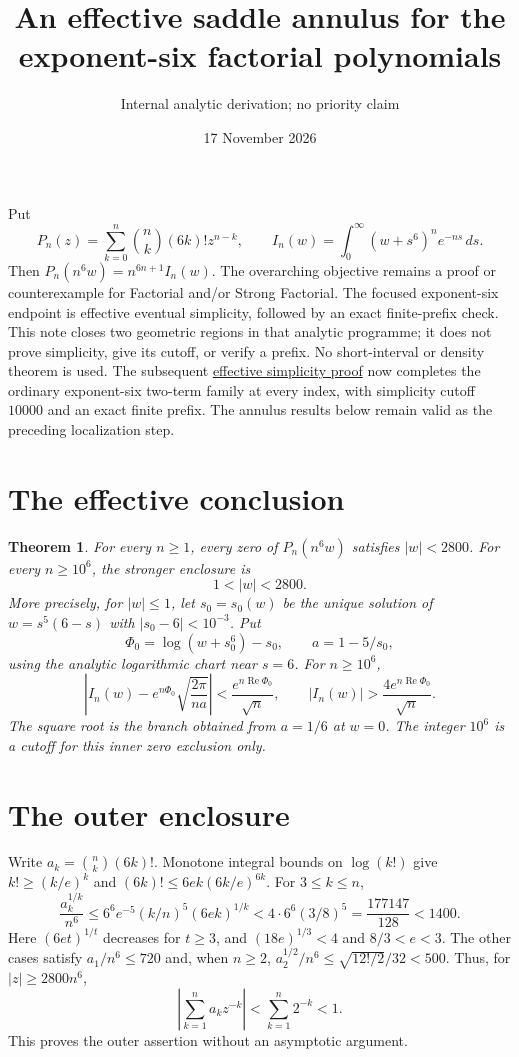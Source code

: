 \documentclass[11pt]{article}
\title{An effective saddle annulus for the exponent-six factorial polynomials}
\author{Internal analytic derivation; no priority claim}
\date{17 November 2026}
\newtheorem{theorem}{Theorem}
\begin{document}
\maketitle
Put
\[
 P_n(z)=\sum_{k=0}^n\binom nk(6k)!z^{n-k},\qquad
 I_n(w)=\int_0^\infty(w+s^6)^n e^{-ns}\,ds.
\]
Then $P_n(n^6w)=n^{6n+1}I_n(w)$. The overarching objective remains a
proof or counterexample for Factorial and/or Strong Factorial. The focused
exponent-six endpoint is effective eventual simplicity, followed by an exact
finite-prefix check. This note closes two geometric regions in that analytic
programme; it does not prove simplicity, give its cutoff, or verify a prefix.
No short-interval or density theorem is used.
The subsequent \href{EFFECTIVE_EXPONENT_SIX_SIMPLICITY.tex}{effective simplicity proof}
now completes the ordinary exponent-six two-term family at every index,
with simplicity cutoff $10000$ and an exact finite prefix. The annulus
results below remain valid as the preceding localization step.

\section{The effective conclusion}
\begin{theorem}\label{thm:annulus}
For every $n\ge1$, every zero of $P_n(n^6w)$ satisfies $|w|<2800$.
For every $n\ge10^6$, the stronger enclosure is
\[
                         1<|w|<2800.                   \tag{1}
\]
More precisely, for $|w|\le1$, let $s_0=s_0(w)$ be the unique solution of
$w=s^5(6-s)$ with $|s_0-6|<10^{-3}$. Put
\[
 \Phi_0=\log(w+s_0^6)-s_0,\qquad a=1-5/s_0,
\]
using the analytic logarithmic chart near $s=6$. For $n\ge10^6$,
\[
 \left|I_n(w)-e^{n\Phi_0}\sqrt{\frac{2\pi}{na}}\right|
 <\frac{e^{n\operatorname{Re}\Phi_0}}{\sqrt n},\qquad
 |I_n(w)|>\frac{4e^{n\operatorname{Re}\Phi_0}}{\sqrt n}. \tag{2}
\]
The square root is the branch obtained from $a=1/6$ at $w=0$.
The integer $10^6$ is a cutoff for this inner zero exclusion only.
\end{theorem}

\section{The outer enclosure}
Write $a_k=\binom nk(6k)!$. Monotone integral bounds on $\log(k!)$ give
$k!\ge(k/e)^k$ and $(6k)!\le6ek(6k/e)^{6k}$. For $3\le k\le n$,
\[
 \frac{a_k^{1/k}}{n^6}
 \le 6^6e^{-5}(k/n)^5(6ek)^{1/k}
 <4\cdot6^6(3/8)^5=\frac{177147}{128}<1400.
\]
Here $(6et)^{1/t}$ decreases for $t\ge3$, and
$(18e)^{1/3}<4$ and $8/3<e<3$. The other cases satisfy
$a_1/n^6\le720$ and, when $n\ge2$,
$a_2^{1/2}/n^6\le\sqrt{12!/2}/32<500$.
Thus, for $|z|\ge2800n^6$,
\[
 \left|\sum_{k=1}^n a_kz^{-k}\right|<\sum_{k=1}^n2^{-k}<1.
\]
This proves the outer assertion without an asymptotic argument.
\end{document}
